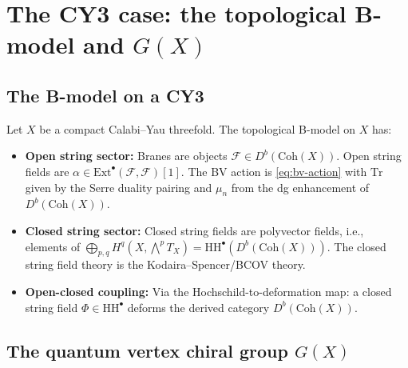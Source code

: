 \documentclass[11pt]{amsart}
\theoremstyle{plain}
\theoremstyle{definition}
\theoremstyle{remark}
\newcommand{\Coh}{\mathrm{Coh}}
\newcommand{\HH}{\mathrm{HH}}
\newcommand{\Tr}{\mathrm{Tr}}
\newcommand{\Ext}{\mathrm{Ext}}
\newcommand{\cF}{\mathcal{F}}
\begin{document}
\section{The CY3 case: the topological B-model and $G(X)$}
\label{sec:cy3}

\subsection{The B-model on a CY3}
\label{subsec:b-model-cy3}

Let $X$ be a compact Calabi--Yau threefold. The topological B-model on $X$ has:

\begin{itemize}
 \item \textbf{Open string sector:} Branes are objects $\cF \in D^b(\Coh(X))$. Open string fields are $\alpha \in \Ext^\bullet(\cF, \cF)[1]$. The BV action is \eqref{eq:bv-action} with $\Tr$ given by the Serre duality pairing and $\mu_n$ from the dg enhancement of $D^b(\Coh(X))$.
 \item \textbf{Closed string sector:} Closed string fields are polyvector fields, i.e., elements of $\bigoplus_{p,q} H^q(X, \bigwedge^p T_X) = \HH^\bullet(D^b(\Coh(X)))$. The closed string field theory is the Kodaira--Spencer/BCOV theory.
 \item \textbf{Open-closed coupling:} Via the Hochschild-to-deformation map: a closed string field $\Phi \in \HH^\bullet$ deforms the derived category $D^b(\Coh(X))$.
\end{itemize}

\subsection{The quantum vertex chiral group $G(X)$}
\label{subsec:qvcg}
\end{document}
